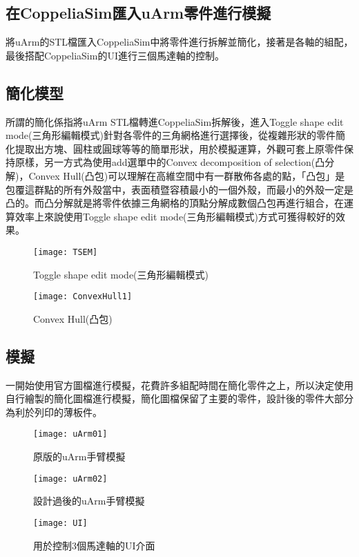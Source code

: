 \subsection{在CoppeliaSim匯入uArm零件進行模擬}
 將uArm的STL檔匯入CoppeliaSim中將零件進行拆解並簡化，接著是各軸的組配，最後搭配CoppeliaSim的UI進行三個馬達軸的控制。\\

\subsection{簡化模型}
 所謂的簡化係指將uArm STL檔轉進CoppeliaSim拆解後，進入Toggle shape edit mode(三角形編輯模式)針對各零件的三角網格進行選擇後，從複雜形狀的零件簡化提取出方塊、圓柱或圓球等等的簡單形狀，用於模擬運算，外觀可套上原零件保持原樣，另一方式為使用add選單中的Convex decomposition of selection(凸分解)，Convex Hull(凸包)可以理解在高維空間中有一群散佈各處的點，「凸包」是包覆這群點的所有外殼當中，表面積暨容積最小的一個外殼，而最小的外殼一定是凸的。而凸分解就是將零件依據三角網格的頂點分解成數個凸包再進行組合，在運算效率上來說使用Toggle shape edit mode(三角形編輯模式)方式可獲得較好的效果。\\

\begin{figure}
\begin{center}
\texttt{[image: TSEM]}
\caption{\Large Toggle shape edit mode(三角形編輯模式)}\label{TSEM}
\end{center}
\end{figure}

\begin{figure}
\begin{center}
\texttt{[image: ConvexHull1]}
\caption{\Large Convex Hull(凸包)}\label{ConvexHull1}
\end{center}
\end{figure}

\subsection{模擬}
 一開始使用官方圖檔進行模擬，花費許多組配時間在簡化零件之上，所以決定使用自行繪製的簡化圖檔進行模擬，簡化圖檔保留了主要的零件，設計後的零件大部分為利於列印的薄板件。\\
\begin{figure}
\begin{center}
\texttt{[image: uArm01]}
\caption{\Large 原版的uArm手臂模擬}\label{uArm01}
\end{center}
\end{figure}

\begin{figure}
\begin{center}
\texttt{[image: uArm02]}
\caption{\Large 設計過後的uArm手臂模擬}\label{uArm02}
\end{center}
\end{figure}

\begin{figure}
\begin{center}
\texttt{[image: UI]}
\caption{\Large 用於控制3個馬達軸的UI介面}\label{UI}
\end{center}
\end{figure}
\newpage

